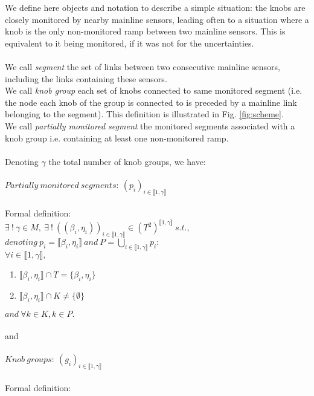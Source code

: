We define here objects and notation to describe a simple situation: the knobs are closely monitored by nearby mainline sensors, leading often to a situation where a knob is the only non-monitored ramp between two mainline sensors. This is equivalent to it being monitored, if it was not for the uncertainties.\\
\\
We call \emph{segment} the set of links between two consecutive mainline sensors, including the links containing these sensors. \\
We call \emph{knob group} each set of knobs connected to same monitored segment (i.e. the node each knob of the group is connected to is preceded by a mainline link belonging to the segment).
This definition is illustrated in Fig. \ref{fig:scheme}.\\
We call \emph{partially monitored segment} the monitored segments associated with a knob group i.e. containing at least one non-monitored ramp.\\
\\
Denoting $\gamma$ the total number of knob groups, we have:\\
\\
$Partially\ monitored\ segments:\ (p_{i})_{i \in \llbracket 1,\gamma \rrbracket}$\\ 
\\
Formal definition:\\
$\exists\ !\ \gamma\in M,\ \exists\ !\ ((\beta_{i},\eta_{i}))_{i\in\llbracket 1,\gamma\rrbracket}\in (T^2)^{\llbracket 1,\gamma\rrbracket}\ s.t.,$\\
$denoting\ p_{i}=\llbracket \beta_{i},\eta_{i} \rrbracket\ and\ P=\underset{i\in \llbracket 1,\gamma \rrbracket}{\bigcup}  p_{i}:$\\
$\forall i\in\llbracket 1,\gamma \rrbracket,$
\begin{enumerate}
	\item $\llbracket \beta_{i},\eta_{i} \rrbracket \cap T=\{\beta_{i},\eta_{i}\}$
	\item $\llbracket \beta_{i}, \eta_{i} \rrbracket \cap K\not= \{\emptyset \}$
\end{enumerate}
$and\ \forall k\in K, k\in P.$\\
\\
and\\
\\
$Knob\ groups:\ (g_{i})_{i\in \llbracket 1,\gamma \rrbracket}$\\
\\
Formal definition:\\

